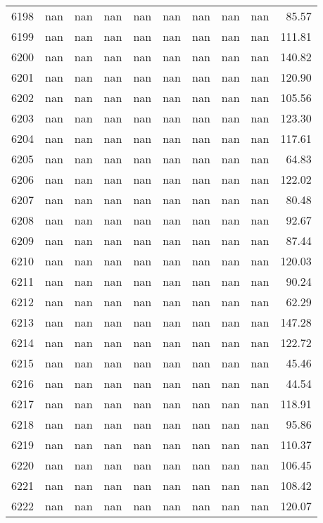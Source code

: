 \begin{tabular}{lrrrrrrrrr}
6198 & nan & nan & nan & nan & nan & nan & nan & nan & 85.57 \\
6199 & nan & nan & nan & nan & nan & nan & nan & nan & 111.81 \\
6200 & nan & nan & nan & nan & nan & nan & nan & nan & 140.82 \\
6201 & nan & nan & nan & nan & nan & nan & nan & nan & 120.90 \\
6202 & nan & nan & nan & nan & nan & nan & nan & nan & 105.56 \\
6203 & nan & nan & nan & nan & nan & nan & nan & nan & 123.30 \\
6204 & nan & nan & nan & nan & nan & nan & nan & nan & 117.61 \\
6205 & nan & nan & nan & nan & nan & nan & nan & nan & 64.83 \\
6206 & nan & nan & nan & nan & nan & nan & nan & nan & 122.02 \\
6207 & nan & nan & nan & nan & nan & nan & nan & nan & 80.48 \\
6208 & nan & nan & nan & nan & nan & nan & nan & nan & 92.67 \\
6209 & nan & nan & nan & nan & nan & nan & nan & nan & 87.44 \\
6210 & nan & nan & nan & nan & nan & nan & nan & nan & 120.03 \\
6211 & nan & nan & nan & nan & nan & nan & nan & nan & 90.24 \\
6212 & nan & nan & nan & nan & nan & nan & nan & nan & 62.29 \\
6213 & nan & nan & nan & nan & nan & nan & nan & nan & 147.28 \\
6214 & nan & nan & nan & nan & nan & nan & nan & nan & 122.72 \\
6215 & nan & nan & nan & nan & nan & nan & nan & nan & 45.46 \\
6216 & nan & nan & nan & nan & nan & nan & nan & nan & 44.54 \\
6217 & nan & nan & nan & nan & nan & nan & nan & nan & 118.91 \\
6218 & nan & nan & nan & nan & nan & nan & nan & nan & 95.86 \\
6219 & nan & nan & nan & nan & nan & nan & nan & nan & 110.37 \\
6220 & nan & nan & nan & nan & nan & nan & nan & nan & 106.45 \\
6221 & nan & nan & nan & nan & nan & nan & nan & nan & 108.42 \\
6222 & nan & nan & nan & nan & nan & nan & nan & nan & 120.07 \\

\end{tabular}
